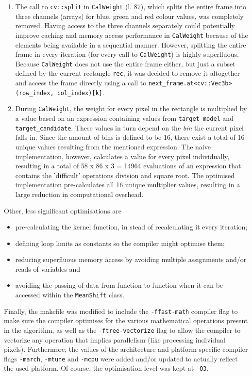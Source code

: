 \documentclass[final]{article}
\begin{document}
\begin{enumerate}
    \item The call to \texttt{cv::split} in \texttt{CalWeight} (l. 87), which splits the entire frame into three channels (arrays) for blue, green and red colour values, was completely removed. Having access to the three channels separately could potentially improve caching and memory access performance in \texttt{CalWeight} because of the elements being available in a sequential manner. However, splitting the entire frame in every iteration (for every call to \texttt{CalWeight}) is highly superfluous. Because \texttt{CalWeight} does not use the entire frame either, but just a subset defined by the current rectangle \texttt{rec}, it was decided to remove it altogether and access the frame directly using a call to \texttt{next\_frame.at<cv::Vec3b>(row\_index, col\_index)[k]}.

    \item During \texttt{CalWeight}, the weight for every pixel in the rectangle is multiplied by a value based on an expression containing values from \texttt{target\_model} and \texttt{target\_candidate}. These values in turn depend on the \emph{bin} the current pixel falls in. Since the amount of bins is defined to be 16, there exist a total of 16 unique values resulting from the mentioned expression. The naive implementation, however, calculates a value for every pixel individually, resulting in a total of 58 x 86 x 3 = 14964 evaluations of an expression that contains the 'difficult' operations division and square root. The optimised implementation pre-calculates all 16 unique multiplier values, resulting in a large reduction in computational overhead.
\end{enumerate}

Other, less significant optimisations are
\begin{itemize}
     \item pre-calculating the kernel function, in stead of recalculating it every iteration;
     \item defining loop limits as constants so the compiler might optimise them;
     \item reducing superfluous memory access by avoiding multiple assignments and/or reads of variables and
     \item avoiding the passing of data from function to function when it can be accessed within the \texttt{MeanShift} class.
\end{itemize}

Finally, the makefile was modified to include the \texttt{-ffast-math} compiler flag to make sure the compiler optimises for the various mathematical operations present in the algorithm, as well as the \texttt{-ftree-vectorize} flag to allow the compiler to vectorize any operation that implies parallelism (like processing individual pixels). Furthermore, the values of the architecture and platform specific compiler flags \texttt{-march}, \texttt{-mtune} and \texttt{-mcpu} were added and/or updated to actually reflect the used platform. Of course, the optimisation level was kept at \texttt{-O3}.
\end{document}
